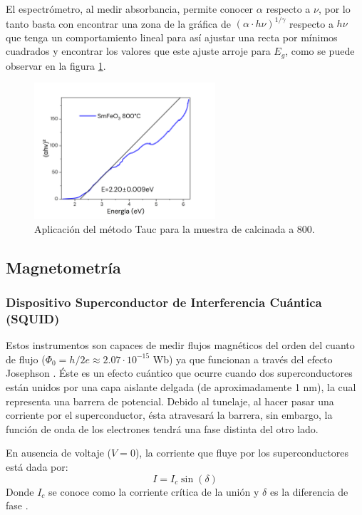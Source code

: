 \documentclass[../main.tex]{subfiles}
\begin{document}
El espectrómetro, al medir absorbancia, permite conocer $\alpha$ respecto a $\nu$, por lo tanto basta con encontrar una zona de la gráfica de $(\alpha\cdot h\nu)^{1/\gamma}$ respecto a $h\nu$ que tenga un comportamiento lineal para así ajustar una recta por mínimos cuadrados y encontrar los valores que este ajuste arroje para $E_g$, como se puede observar en la figura \ref{fig:ejemplotauc}.
\begin{figure}[H]
    \centering
    \includegraphics[width=0.6\textwidth]{fig/ejemplotauc.png}
    \caption{Aplicación del método Tauc para la muestra de \sama{} calcinada a 800\gradoC.}
    \label{fig:ejemplotauc}
\end{figure}
\subsection{Magnetometría}

\subsubsection{Dispositivo Superconductor de Interferencia Cuántica (SQUID)}
Estos instrumentos son capaces de medir flujos magnéticos del orden del cuanto de flujo ($\Phi_0=h/2e\approx2.07\cdot10^{-15}$ Wb) ya que funcionan a través del efecto Josephson \cite{Pekola2003}. Éste es un efecto cuántico que ocurre cuando dos superconductores están unidos por una capa aislante delgada (de aproximadamente 1 nm), la cual representa una barrera de potencial. Debido al tunelaje, al hacer pasar una corriente por el superconductor, ésta atravesará la barrera, sin embargo, la función de onda de los electrones tendrá una fase distinta del otro lado.

En ausencia de voltaje ($V=0$), la corriente que fluye por los superconductores está dada por:
\begin{equation}
    I=I_c\sin(\delta)
    \label{eq:corrientecritica}
\end{equation}
Donde $I_c$ se conoce como la corriente crítica de la unión y $\delta$ es la diferencia de fase \cite{Kirtley1999}.
\end{document}
